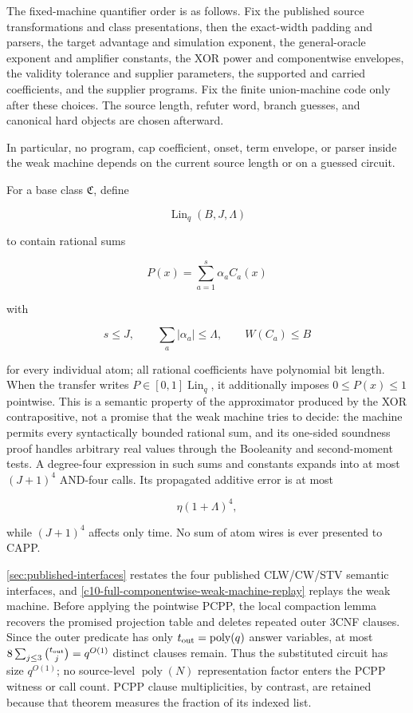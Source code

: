 \documentclass[11pt,letterpaper]{article}
\newcommand{\cref}[1]{\ref{#1}}
\theoremstyle{definition}
\theoremstyle{remark}
\begin{document}
The fixed-machine quantifier order is as follows. Fix the published source
transformations and class presentations, then the exact-width padding and
parsers, the target advantage and simulation exponent, the general-oracle
exponent and amplifier constants, the XOR power and componentwise envelopes,
the validity tolerance and supplier parameters, the supported and carried
coefficients, and the supplier programs. Fix the finite union-machine code
only after these choices. The source length, refuter word, branch guesses, and
canonical hard objects are chosen afterward.

In particular, no program, cap coefficient, onset, term envelope, or
parser inside the weak machine depends on the current source length or
on a guessed circuit.

For a base class \(\mathfrak C\), define

\[
\operatorname{Lin}_q(B,J,\Lambda)
\]

to contain rational sums

\[
P(x)=\sum_{a=1}^s\alpha_a C_a(x)
\]

with

\[
s\le J,
\qquad
\sum_a|\alpha_a|\le\Lambda,
\qquad
W(C_a)\le B
\]

for every individual atom; all rational coefficients have polynomial bit
length. When the transfer writes \(P\in[0,1]\operatorname{Lin}_q\), it
additionally imposes \(0\le P(x)\le1\) pointwise. This is a semantic
property of the approximator produced by the XOR contrapositive, not a
promise that the weak machine tries to decide: the machine permits every
syntactically bounded rational sum, and its one-sided soundness proof
handles arbitrary real values through the Booleanity and second-moment
tests. A degree-four expression in such sums and constants expands into
at most \((J+1)^4\) AND-four calls. Its propagated additive error is at
most

\[
\eta(1+\Lambda)^4,
\]

while \((J+1)^4\) affects only time. No sum of atom wires is ever
presented to CAPP.

\cref{sec:published-interfaces} restates the four published CLW/CW/STV semantic interfaces,
and \cref{c10-full-componentwise-weak-machine-replay} replays the weak machine. Before applying the
pointwise PCPP, the local compaction lemma recovers the promised
projection table and deletes repeated outer 3CNF clauses. Since the
outer predicate has only \(t_{\rm out}=\operatorname{poly}(q)\) answer
variables, at most
\(8\sum_{j\le3}\binom{t_{\rm out}}j=q^{O(1)}\) distinct clauses remain.
Thus the substituted circuit has size \(q^{O(1)}\); no source-level
\(\operatorname{poly}(N)\) representation factor enters the PCPP witness
or call count. PCPP clause multiplicities, by contrast, are retained
because that theorem measures the fraction of its indexed list.
\end{document}
